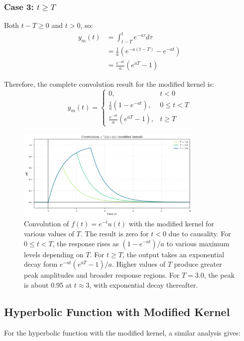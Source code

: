 	\subsubsection{Case 3: $t \geq T$}
	Both $t - T \geq 0$ and $t > 0$, so:
	\begin{align}
		y_m(t) &= \int_{t-T}^{t} e^{-a\tau} d\tau \\
		&= \frac{1}{a}(e^{-a(t-T)} - e^{-at}) \\
		&= \frac{e^{-at}}{a}(e^{aT} - 1)
	\end{align}
	
	Therefore, the complete convolution result for the modified kernel is:
	\begin{equation}
		y_m(t) = 
		\begin{cases} 
			0, & t < 0 \\
			\frac{1}{a}(1 - e^{-at}), & 0 \leq t < T \\
			\frac{e^{-at}}{a}(e^{aT} - 1), & t \geq T
		\end{cases}
	\end{equation}
	
	\begin{figure}[htbp]
		\centering
		\includegraphics[width=0.8\textwidth]{figs/exp_modified_convolution.png}
		\caption{Convolution of $f(t) = e^{-t}u(t)$ with the modified kernel for various values of $T$. The result is zero for $t < 0$ due to causality. For $0 \leq t < T$, the response rises as $(1 - e^{-at})/a$ to various maximum levels depending on $T$. For $t \geq T$, the output takes an exponential decay form $e^{-at}(e^{aT} - 1)/a$. Higher values of $T$ produce greater peak amplitudes and broader response regions. For $T = 3.0$, the peak is about 0.95 at $t \approx 3$, with exponential decay thereafter.}
		\label{fig:exp_modified_convolution}
	\end{figure}
	
	\subsection{Hyperbolic Function with Modified Kernel}
	For the hyperbolic function with the modified kernel, a similar analysis gives:
	
